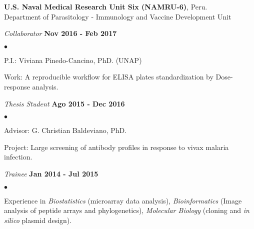 \documentclass[margin,line]{res}
\newenvironment{list1}{
  \begin{list}{\ding{113}}{%
      \setlength{\itemsep}{0in}
      \setlength{\parsep}{0in} \setlength{\parskip}{0in}
      \setlength{\topsep}{0in} \setlength{\partopsep}{0in}
      \setlength{\leftmargin}{0.17in}}}{\end{list}}
\newenvironment{list2}{
  \begin{list}{$\bullet$}{%
      \setlength{\itemsep}{0in}
      \setlength{\parsep}{0in} \setlength{\parskip}{0in}
      \setlength{\topsep}{0in} \setlength{\partopsep}{0in}
      \setlength{\leftmargin}{0.2in}}}{\end{list}}
\begin{document}
\begin{resume}
{\bf U.S. Naval Medical Research Unit Six (NAMRU-6)}, Peru.\\
Department of Parasitology - Immunology and Vaccine Development Unit\\
\vspace*{-.1in}
\begin{list1}
	\item[] {\em Collaborator} \hfill {\bf Nov 2016 - Feb 2017}\\
	\vspace*{-.1in}
	\begin{list2} %
		\item P.I.: Viviana Pinedo-Cancino, PhD. (UNAP)
		\item Work: A reproducible workflow for ELISA plates standardization by Dose-response analysis.\\
	\end{list2}
	\item[] {\em Thesis Student} \hfill {\bf Ago 2015 - Dec 2016}\\
	\vspace*{-.1in}
	\begin{list2} %
		\item Advisor: G. Christian Baldeviano, PhD.
		\item Project: Large screening of antibody profiles in response to vivax malaria infection.\\
	\end{list2}
	\vspace*{-.1in}
	\item[] {\em Trainee} \hfill {\bf Jan 2014 - Jul 2015}\\
	\vspace*{-.1in}
	\begin{list2} %
		\item Experience in \textit{Biostatistics} (microarray data analysis), \textit{Bioinformatics} (Image analysis of peptide arrays and phylogenetics), \textit{Molecular Biology} (cloning and \textit{in silico} plasmid design). %
	\end{list2}
\end{list1}


\end{resume}
\end{document}
